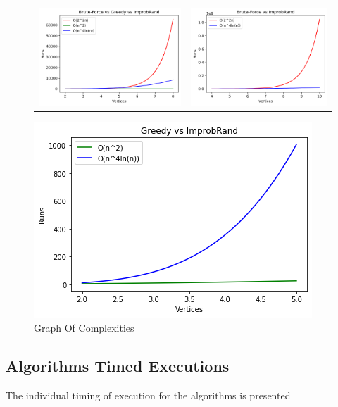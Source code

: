 \documentclass[longpaper, english, final, times]{revdetua}
\begin{document}
			\begin{figure}[h]
				\begin{tabular}{cc}
					\includegraphics[width=0.5\linewidth]{imgs/complexitiesallalgs.png} &   \includegraphics[width=0.5\linewidth]{imgs/complexitiesbruteforceimpprobrand.png} \\
				\end{tabular}
				
				\begin{center}
					\includegraphics[width=0.5\linewidth]{imgs/complexitiesgreedyimpprobrand.png}
				\end{center}
				\caption{Graph Of Complexities}
				\label{figure:complexities}
			\end{figure}
		
		\subsection{Algorithms Timed Executions}
			The individual timing of execution for the algorithms is presented 
			
\end{document}
